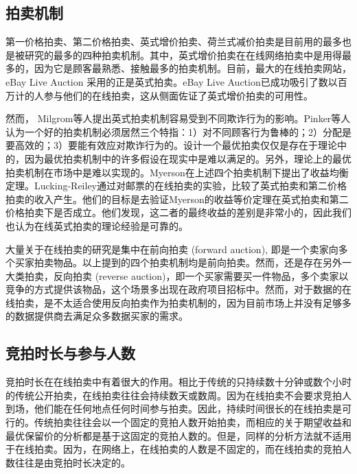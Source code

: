 \subsection{拍卖机制}

第一价格拍卖、第二价格拍卖、英式增价拍卖、荷兰式减价拍卖是目前用的最多也是被研究的最多的四种拍卖机制。其中，英式增价拍卖在在线网络拍卖中是用得最多的，因为它是顾客最熟悉、接触最多的拍卖机制。目前，最大的在线拍卖网站，eBay Live Auction 采用的正是英式拍卖。eBay Live Auction已成功吸引了数以百万计的人参与他们的在线拍卖，这从侧面佐证了英式增价拍卖的可用性。

然而， Milgrom等人\cite{Milgrom1989Auctions}提出英式拍卖机制容易受到不同欺诈行为的影响。Pinker等人\cite{Pinker2001Using,Pinker2003Managing}认为一个好的拍卖机制必须居然三个特指：1）对不同顾客行为鲁棒的；2）分配是要高效的；3）要能有效应对欺诈行为的。设计一个最优拍卖仅仅是存在于理论中的，因为最优拍卖机制中的许多假设在现实中是难以满足的。另外，理论上的最优拍卖机制在市场中是难以实现的。Myerson\cite{Myerson1981Optimal}在上述四个拍卖机制下提出了收益均衡定理。Lucking-Reiley\cite{Lucking1999Using}通过对邮票的在线拍卖的实验，比较了英式拍卖和第二价格拍卖的收入产生。他们的目标是去验证Myerson的收益等价定理在英式拍卖和第二价格拍卖下是否成立。他们发现，这二者的最终收益的差别是非常小的，因此我们也认为在线英式拍卖的理论经验是可靠的。

大量关于在线拍卖的研究是集中在前向拍卖 (forward auction), 即是一个卖家向多个买家拍卖物品。以上提到的四个拍卖机制均是前向拍卖。然而，还是存在另外一大类拍卖，反向拍卖 (reverse auction)，即一个买家需要买一件物品，多个卖家以竞争的方式提供该物品，这个场景多出现在政府项目招标中。然而，对于数据的在线拍卖，是不太适合使用反向拍卖作为拍卖机制的，因为目前市场上并没有足够多的数据提供商去满足众多数据买家的需求。

\subsection{竞拍时长与参与人数}

竞拍时长在在线拍卖中有着很大的作用。相比于传统的只持续数十分钟或数个小时的传统公开拍卖，在线拍卖往往会持续数天或数周。因为在线拍卖不会要求竞拍人到场，他们能在任何地点任何时间参与拍卖\cite{Pinker2003Managing}。因此，持续时间很长的在线拍卖是可行的。传统拍卖往往会以一个固定的竞拍人数开始拍卖，而相应的关于期望收益和最优保留价的分析都是基于这固定的竞拍人数的。但是，同样的分析方法就不适用于在线拍卖。因为，在网络上，在线拍卖的人数是不固定的，而在线拍卖的竞拍人数往往是由竞拍时长决定的。

\begin{figure}
   \centering
 \end{figure}

